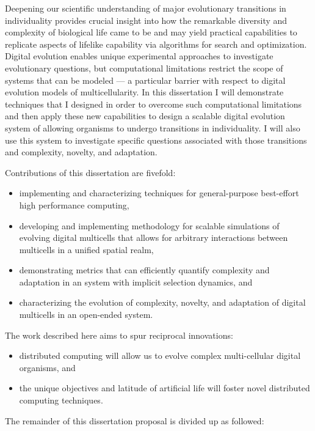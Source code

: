 Deepening our scientific understanding of major evolutionary transitions in individuality provides crucial insight into how the remarkable diversity and complexity of biological life came to be and may yield practical capabilities to replicate aspects of lifelike capability via algorithms for search and optimization.
Digital evolution enables unique experimental approaches to investigate evolutionary questions, but computational limitations restrict the scope of systems that can be modeled --- a particular barrier with respect to digital evolution models of multicellularity.
In this dissertation I will demonstrate techniques that I designed in order to overcome such computational limitations and then apply these new capabilities to design a scalable digital evolution system of allowing organisms to undergo transitions in individuality.
I will also use this system to investigate specific questions associated with those transitions and complexity, novelty, and adaptation.

Contributions of this dissertation are fivefold:
\begin{itemize}
\item implementing and characterizing techniques for general-purpose best-effort high performance computing,
\item developing and implementing methodology for scalable simulations of evolving digital multicells that allows for arbitrary interactions between multicells in a unified spatial realm,
\item demonstrating metrics that can efficiently quantify complexity and adaptation in an system with implicit selection dynamics, and
\item characterizing the evolution of complexity, novelty, and adaptation of digital multicells in an open-ended system.
\end{itemize}

The work described here aims to spur reciprocal innovations:
\begin{itemize}
\item distributed computing will allow us to evolve complex multi-cellular digital organisms, and
\item the unique objectives and latitude of artificial life will foster novel distributed computing techniques.
\end{itemize}

The remainder of this dissertation proposal is divided up as followed:

